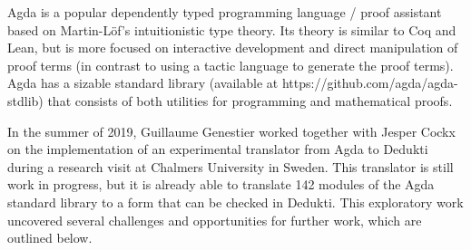 


Agda is a popular dependently typed programming language / proof
assistant based on Martin-L\"of’s intuitionistic type theory. Its theory
is similar to Coq and Lean, but is more focused on interactive
development and direct manipulation of proof terms (in contrast to
using a tactic language to generate the proof terms). Agda has a
sizable standard library (available at
https://github.com/agda/agda-stdlib) that consists of both utilities
for programming and mathematical proofs.


In the summer of 2019, Guillaume Genestier worked together with Jesper
Cockx on the implementation of an experimental translator from Agda to
Dedukti during a research visit at Chalmers University in Sweden. This
translator is still work in progress, but it is already able to
translate 142 modules of the Agda standard library to a form that can
be checked in Dedukti. This exploratory work uncovered several
challenges and opportunities for further work, which are outlined
below.

